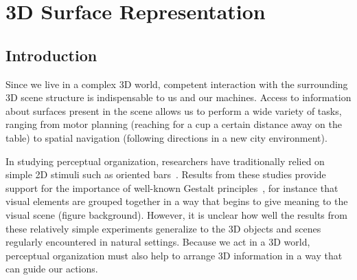 \chapter{3D Surface Representation}
\label{sec:surfaces}

\section{Introduction}
Since we live in a complex 3D world, competent interaction with the
surrounding 3D scene structure is indispensable to us and our machines. Access to information about surfaces present in the scene allows us to perform a wide variety of tasks, ranging from motor planning (\eg reaching for a cup a certain distance away on the table) to spatial navigation (\eg following directions in a new city environment).


In studying perceptual organization, researchers have traditionally
relied on simple 2D stimuli such as oriented bars~\cite{Palmer_02}. Results from these studies provide support for the importance of well-known Gestalt principles~\cite{Koffka35, Wertheimer23}, for instance that visual elements are grouped together in a way that begins to give meaning to the visual scene (\eg figure \vs background). However, it is unclear how well the results from these relatively simple experiments generalize to the 3D objects and scenes regularly encountered in natural settings. Because we act in a 3D world, perceptual organization must also help to arrange 3D information in a way that can guide our actions. 

